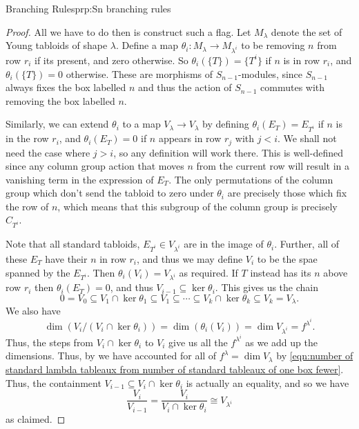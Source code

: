 \documentclass[fleqn]{NotesClass}
\newcommand{\isomorphic}{\cong}
\newcommand{\columnGroup}{C}
\begin{document}
\begin{prp}{Branching Rules}{prp:Sn branching rules}
\begin{proof}
            All we have to do then is construct such a flag.
            Let \(M_\lambda\) denote the set of Young tabloids of shape \(\lambda\).
            Define a map \(\theta_i \colon M_\lambda \to M_{\lambda^i}\) to be removing \(n\) from row \(r_i\) if its present, and zero otherwise.
            So \(\theta_i(\{T\}) = \{T^i\}\) if \(n\) is in row \(r_i\), and \(\theta_i(\{T\}) = 0\) otherwise.
            These are morphisms of \(S_{n-1}\)-modules, since \(S_{n-1}\) always fixes the box labelled \(n\) and thus the action of \(S_{n-1}\) commutes with removing the box labelled \(n\).
            
            Similarly, we can extend \(\theta_i\) to a map \(V_\lambda \to V_\lambda\) by defining \(\theta_i(E_T) = E_{T^i}\) if \(n\) is in the row \(r_i\), and \(\theta_i(E_T) = 0\) if \(n\) appears in row \(r_j\) with \(j < i\).
            We shall not need the case where \(j > i\), so any definition will work there.
            This is well-defined since any column group action that moves \(n\) from the current row will result in a vanishing term in the expression of \(E_T\).
            The only permutations of the column group which don't send the tabloid to zero under \(\theta_i\) are precisely those which fix the row of \(n\), which means that this subgroup of the column group is precisely \(\columnGroup_{T^i}\).
            
            Note that all standard tabloids, \(E_{T^i} \in V_{\lambda^i}\) are in the image of \(\theta_i\).
            Further, all of these \(E_T\) have their \(n\) in row \(r_i\), and thus we may define \(V_i\) to be the spae spanned by the \(E_{T^i}\).
            Then \(\theta_i(V_i) = V_{\lambda^i}\) as required.
            If \(T\) instead has its \(n\) above row \(r_i\) then \(\theta_i(E_T) = 0\), and thus \(V_{i-1} \subseteq \ker \theta_i\).
            This gives us the chain
            \begin{equation}
                0 = V_0 \subseteq V_1 \cap \ker \theta_1 \subseteq V_1 \subseteq \dotsb \subseteq V_k \cap \ker \theta_k \subseteq V_k = V_\lambda.
            \end{equation}
            We also have
            \begin{equation}
                \dim(V_i/(V_i \cap \ker \theta_i)) = \dim (\theta_i(V_i)) = \dim V_{\lambda^i} = f^{\lambda^i}.
            \end{equation}
            Thus, the steps from \(V_i \cap \ker \theta_i\) to \(V_i\) give us all the \(f^{\lambda^i}\) as we add up the dimensions.
            Thus, by we have accounted for all of \(f^\lambda = \dim V_\lambda\) by \cref{eqn:number of standard lambda tableaux from number of standard tableaux of one box fewer}.
            Thus, the containment \(V_{i-1} \subseteq V_i \cap \ker \theta_i\) is actually an equality, and so we have
            \begin{equation}
                \frac{V_i}{V_{i-1}} = \frac{V_i}{V_i \cap \ker \theta_i} \isomorphic V_{\lambda^i}
            \end{equation}
            as claimed.
        \end{proof}
    \end{prp}
\end{document}
